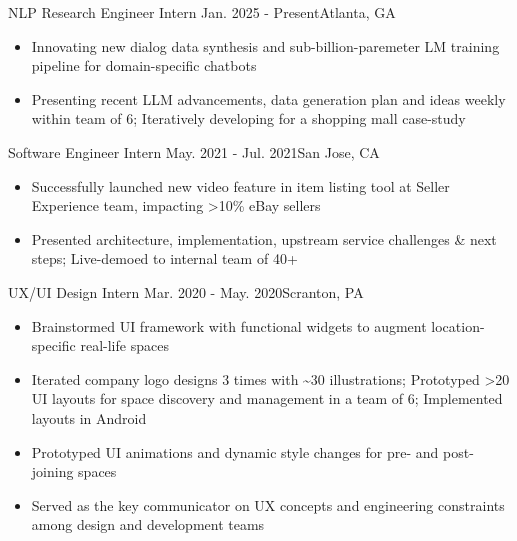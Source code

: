     {NLP Research Engineer Intern}
    {Jan. 2025 - Present}{Atlanta, GA}
\begin{itemize}
    \item Innovating new dialog data synthesis and sub-billion-paremeter LM training pipeline for domain-specific chatbots
    \item Presenting recent LLM advancements, data generation plan and ideas weekly within team of 6; Iteratively developing for a shopping mall case-study
\end{itemize}
\dividerSmall


    {Software Engineer Intern}
    {May. 2021 - Jul. 2021}{San Jose, CA}
\begin{itemize}

    \item Successfully launched new video feature in item listing tool at Seller Experience team, impacting >10\% eBay sellers

    \item Presented architecture, implementation, upstream service challenges \& next steps; Live-demoed to internal team of 40+
\end{itemize}
\dividerSmall


    {UX/UI Design Intern}
    {Mar. 2020 - May. 2020}{Scranton, PA}{}
\begin{itemize}

    \item Brainstormed UI framework with functional widgets to augment location-specific real-life spaces

    \item Iterated company logo designs 3 times with \textasciitilde30 illustrations; Prototyped >20 UI layouts
    for space discovery and management in a team of 6; Implemented layouts in Android

    \item Prototyped UI animations and dynamic style changes for pre- and post-joining spaces

    \item Served as the key communicator on UX concepts and engineering constraints among design and development teams
\end{itemize}
\dividerSmall

